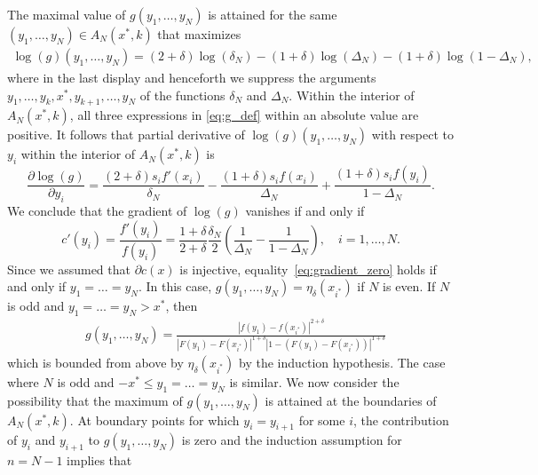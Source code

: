 \begin{proof-of-lemma}[\ref{lem:bound_intervals_delta}]
  The maximal value of $g(y_1,\ldots,y_N)$ is attained for the same
  $(y_1,\ldots,y_N) \in A_N(x^*,k)$ that maximizes
  \begin{align*}
    \log(g)(y_1,\ldots, y_N) =  (2+\delta) \log \left( \delta_N  \right)  - (1+\delta) \log \left( \Delta_N  \right) - (1+\delta) \log \left(1 - \Delta_N \right),
  \end{align*}
  where in the last display and henceforth we suppress the arguments
  $y_1,\ldots,y_k,x^*,y_{k+1},\ldots, y_N$ of the functions $\delta_N$ and
  $\Delta_N$. %
  Within the interior of $A_N(x^*,k)$, all three expressions in
  \eqref{eq:g_def} within an absolute value are positive. It follows that
  partial derivative of $\log(g)(y_1,\ldots,y_N)$ with respect to $y_i$ within
  the interior of $A_N(x^*,k)$ is
  \begin{equation*}
    \frac{\partial \log(g)}{\partial y_i} = \frac{(2+\delta) s_i
      f'(x_i)}{\delta_N } -\frac{(1+\delta) s_i f(x_i)}{\Delta_N } +
    \frac{(1+\delta)s_i f(y_i)}{1-\Delta_N }.
  \end{equation*}
  We conclude that the gradient of $\log(g)$ vanishes if and only if
  \begin{equation}
    \label{eq:gradient_zero}
    c'(y_i) = \frac{f'(y_i)}{f(y_i)} = \frac{1+\delta}{2+\delta} \frac{\delta_N}{2} \left( \frac{1}{\Delta_N} - \frac{1}{1-\Delta_N } \right),\quad i=1,\ldots,N.
  \end{equation}
  Since we assumed that $\partial c(x)$ is injective,
  equality~\eqref{eq:gradient_zero} holds if and only if $y_1 = \ldots
  = y_N$. In this case, $g(y_1,\ldots,y_N) = \eta_\delta(x_{i^*})$ if $N$ is
  even. If $N$ is odd and $y_1 = \ldots = y_N > x^*$, then
  \begin{align*}
    & g(y_1,\ldots,y_N) = \frac{\left| f(y_1)-f(x_{i^*})  \right|^{2+\delta}} { 
      \left|  F(y_1) - F(x_{i^*}) \right|^{1+ \delta} 
      \left| 1 - (F(y_1) -F(x_{i^*})) \right|^{1+ \delta} } 
  \end{align*} 
  which is bounded from above by $\eta_\delta(x_{i^*})$ by the induction hypothesis. The case where $N$ is odd and $-x^* \leq y_1 = \ldots = y_N$ is similar. 
  We now consider the possibility that the maximum of $g(y_1,\ldots,y_N)$ is attained at the boundaries of $A_N(x^*,k)$. At boundary points for which $y_i = y_{i+1}$ for some $i$, the contribution of $y_i$ and $y_{i+1}$ to $g(y_1,\ldots,y_N)$ is zero and the induction assumption for $n=N-1$ implies that 
  \begin{equation*}

\end{equation*}
\end{proof-of-lemma}
